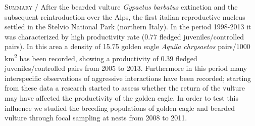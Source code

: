 {\small
\noindent \textsc{\color{MUSEBLUE} Summary} / After the bearded vulture \textit{Gypaetus barbatus} extinction and the
subsequent reintroduction over the Alps, the first italian reproductive
nucleus settled in the Stelvio National Park (northern Italy). In the
period 1998-2013 it was characterized by high productivity rate (0.77
fledged juveniles/controlled pairs). In this area a density of 15.75
golden eagle \textit{Aquila chrysaetos} pairs/1000
km\textsuperscript{2} has been recorded, showing a productivity of 0.39
fledged juveniles/controlled pairs from 2005 to 2013. Furthermore in
this period many interspecific observations of aggressive interactions
have been recorded; starting from these data a research started to
assess whether the return of the vulture may have affected the
productivity of the golden eagle. In order to test this influence we
studied the breeding populations of golden eagle and bearded vulture
through focal sampling at nests from 2008 to 2011.

}
